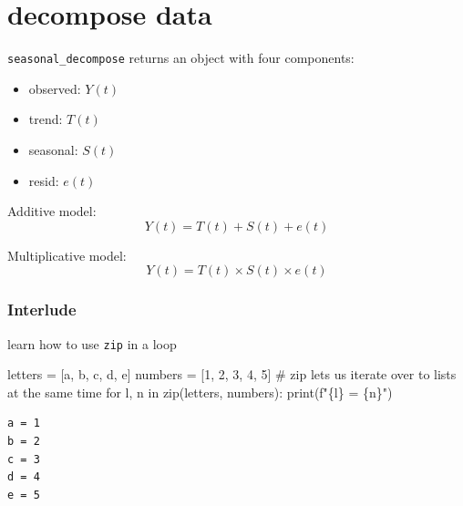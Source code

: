 \documentclass[
  letterpaper,
  DIV=11,
  numbers=noendperiod,
  oneside]{scrreprt}
\newenvironment{Shaded}{\begin{snugshade}}{\end{snugshade}}
\newcommand{\BuiltInTok}[1]{\textcolor[rgb]{0.00,0.23,0.31}{#1}}
\newcommand{\CommentTok}[1]{\textcolor[rgb]{0.37,0.37,0.37}{#1}}
\newcommand{\ControlFlowTok}[1]{\textcolor[rgb]{0.00,0.23,0.31}{#1}}
\newcommand{\DecValTok}[1]{\textcolor[rgb]{0.68,0.00,0.00}{#1}}
\newcommand{\KeywordTok}[1]{\textcolor[rgb]{0.00,0.23,0.31}{#1}}
\newcommand{\NormalTok}[1]{\textcolor[rgb]{0.00,0.23,0.31}{#1}}
\newcommand{\OperatorTok}[1]{\textcolor[rgb]{0.37,0.37,0.37}{#1}}
\newcommand{\SpecialCharTok}[1]{\textcolor[rgb]{0.37,0.37,0.37}{#1}}
\newcommand{\SpecialStringTok}[1]{\textcolor[rgb]{0.13,0.47,0.30}{#1}}
\newcommand{\StringTok}[1]{\textcolor[rgb]{0.13,0.47,0.30}{#1}}
\providecommand{\tightlist}{%
  \setlength{\itemsep}{0pt}\setlength{\parskip}{0pt}}\usepackage{longtable,booktabs,array}
\begin{document}
\hypertarget{decompose-data}{%
\section{decompose data}\label{decompose-data}}

\texttt{seasonal\_decompose} returns an object with four components:

\begin{itemize}
\tightlist
\item
  observed: \(Y(t)\)
\item
  trend: \(T(t)\)
\item
  seasonal: \(S(t)\)
\item
  resid: \(e(t)\)
\end{itemize}

Additive model: \[
Y(t) = T(t) + S(t) + e(t)
\]

Multiplicative model: \[
Y(t) = T(t) \times S(t) \times e(t)
\]

\hypertarget{interlude}{%
\subsubsection{Interlude}\label{interlude}}

learn how to use \texttt{zip} in a loop

\begin{Shaded}
\begin{Highlighting}[]
\NormalTok{letters }\OperatorTok{=}\NormalTok{ [}\StringTok{\textquotesingle{}a\textquotesingle{}}\NormalTok{, }\StringTok{\textquotesingle{}b\textquotesingle{}}\NormalTok{, }\StringTok{\textquotesingle{}c\textquotesingle{}}\NormalTok{, }\StringTok{\textquotesingle{}d\textquotesingle{}}\NormalTok{, }\StringTok{\textquotesingle{}e\textquotesingle{}}\NormalTok{]}
\NormalTok{numbers }\OperatorTok{=}\NormalTok{ [}\DecValTok{1}\NormalTok{, }\DecValTok{2}\NormalTok{, }\DecValTok{3}\NormalTok{, }\DecValTok{4}\NormalTok{, }\DecValTok{5}\NormalTok{]}
\CommentTok{\# zip let\textquotesingle{}s us iterate over to lists at the same time}
\ControlFlowTok{for}\NormalTok{ l, n }\KeywordTok{in} \BuiltInTok{zip}\NormalTok{(letters, numbers):}
    \BuiltInTok{print}\NormalTok{(}\SpecialStringTok{f"}\SpecialCharTok{\{}\NormalTok{l}\SpecialCharTok{\}}\SpecialStringTok{ = }\SpecialCharTok{\{}\NormalTok{n}\SpecialCharTok{\}}\SpecialStringTok{"}\NormalTok{)}
\end{Highlighting}
\end{Shaded}

\begin{verbatim}
a = 1
b = 2
c = 3
d = 4
e = 5
\end{verbatim}
\end{document}
